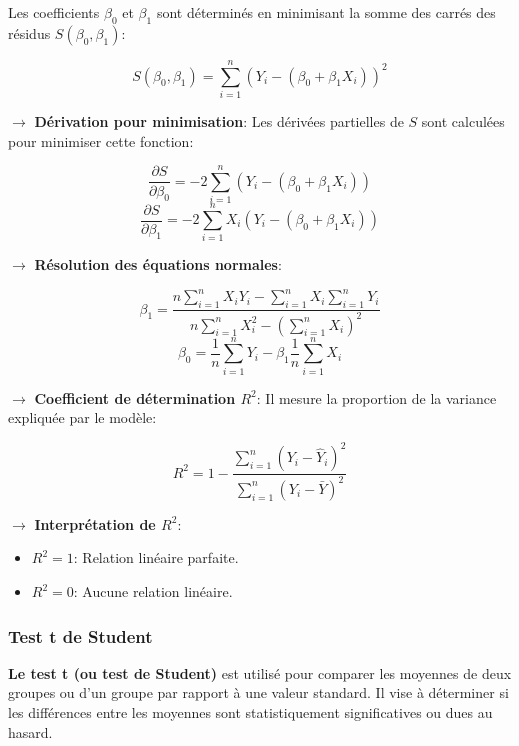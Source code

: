 Les coefficients \( \beta_0 \) et \( \beta_1 \) sont déterminés en minimisant la somme des carrés des résidus \( S(\beta_0, \beta_1) \):

\[
S(\beta_0, \beta_1) = \sum_{i=1}^{n} \left( Y_i - (\beta_0 + \beta_1 X_i) \right)^2
\]

\noindent \textbf{\(\rightarrow\)} \textbf{Dérivation pour minimisation}: Les dérivées partielles de \( S \) sont calculées pour minimiser cette fonction:

\[
\frac{\partial S}{\partial \beta_0} = -2 \sum_{i=1}^{n} \left( Y_i - (\beta_0 + \beta_1 X_i) \right)
\]
\[
\frac{\partial S}{\partial \beta_1} = -2 \sum_{i=1}^{n} X_i \left( Y_i - (\beta_0 + \beta_1 X_i) \right)
\]

\noindent \textbf{\(\rightarrow\)}  \textbf{Résolution des équations normales}:

\[
\beta_1 = \frac{n \sum_{i=1}^{n} X_i Y_i - \sum_{i=1}^{n} X_i \sum_{i=1}^{n} Y_i}{n \sum_{i=1}^{n} X_i^2 - \left( \sum_{i=1}^{n} X_i \right)^2}
\]
\[
\beta_0 = \frac{1}{n} \sum_{i=1}^{n} Y_i - \beta_1 \frac{1}{n} \sum_{i=1}^{n} X_i
\]

\noindent \textbf{\(\rightarrow\)}  \textbf{Coefficient de détermination \( R^2 \)}: Il mesure la proportion de la variance expliquée par le modèle:

\[
R^2 = 1 - \frac{\sum_{i=1}^{n} (Y_i - \hat{Y}_i)^2}{\sum_{i=1}^{n} (Y_i - \bar{Y})^2}
\]

\noindent \textbf{\(\rightarrow\)} \textbf{Interprétation de \( R^2 \)}:
\begin{itemize}
    \item \( R^2 = 1 \): Relation linéaire parfaite.
    \item \( R^2 = 0 \): Aucune relation linéaire.
\end{itemize}


\subsubsection{Test t de Student}

\textbf{Le test t (ou test de Student)} est utilisé pour comparer les moyennes de deux groupes ou d'un groupe par rapport à une valeur standard. Il vise à déterminer si les différences entre les moyennes sont statistiquement significatives ou dues au hasard.

